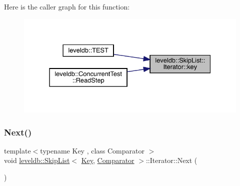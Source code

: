Here is the caller graph for this function\+:
\nopagebreak
\begin{figure}[H]
\begin{center}
\leavevmode
\includegraphics[width=331pt]{classleveldb_1_1_skip_list_1_1_iterator_a8b9bc9940fbf067a3fb500ebae6999be_icgraph}
\end{center}
\end{figure}
\mbox{\label{classleveldb_1_1_skip_list_1_1_iterator_ade5a684c74056f578f85237735da0cef}} 
\subsubsection{\texorpdfstring{Next()}{Next()}}
{\footnotesize\ttfamily template$<$typename Key , class Comparator $>$ \\
void \mbox{\hyperlink{classleveldb_1_1_skip_list}{leveldb\+::\+Skip\+List}}$<$ \mbox{\hyperlink{namespaceleveldb_a7e9a9725b13fa0bd922d885280dfab95}{Key}}, \mbox{\hyperlink{structleveldb_1_1_comparator}{Comparator}} $>$\+::Iterator\+::\+Next (\begin{DoxyParamCaption}{ }\end{DoxyParamCaption})\hspace{0.3cm}{\ttfamily [inline]}}

